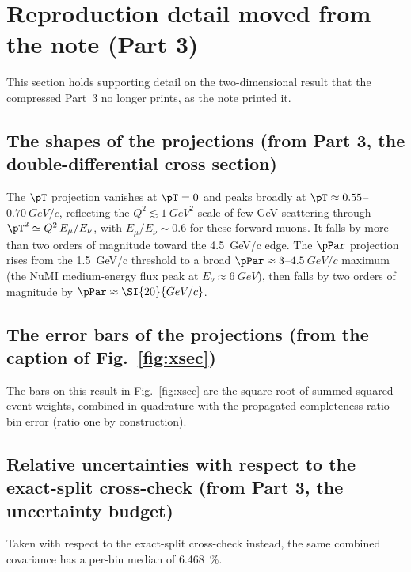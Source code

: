 \section{Reproduction detail moved from the note (Part 3)}
This section holds supporting detail on the two-dimensional result that the compressed Part~3 no longer prints, as the note printed it.

\subsection{The shapes of the projections (from Part 3, the double-differential cross section)}
The $\pT$ projection vanishes at $\pT=0$ and peaks broadly at $\pT\approx0.55$--$\SI{0.70}{GeV/c}$, reflecting the $Q^{2}\lesssim\SI{1}{GeV^2}$ scale of few-GeV scattering through $\pT^{2}\simeq Q^{2}\,E_\mu/E_\nu$, with $E_\mu/E_\nu\sim0.6$ for these forward muons. It falls by more than two orders of magnitude toward the \SI{4.5}{GeV/c} edge. The $\pPar$ projection rises from the \SI{1.5}{GeV/c} threshold to a broad $\pPar\approx3$--$\SI{4.5}{GeV/c}$ maximum (the NuMI medium-energy flux peak at $E_\nu\approx\SI{6}{GeV}$), then falls by two orders of magnitude by $\pPar\approx\SI{20}{GeV/c}$.

\subsection{The error bars of the projections (from the caption of Fig.~\ref{fig:xsec})}
The bars on this result in Fig.~\ref{fig:xsec} are the square root of summed squared event weights, combined in quadrature with the propagated completeness-ratio bin error (ratio one by construction).

\subsection{Relative uncertainties with respect to the exact-split cross-check (from Part 3, the uncertainty budget)}
Taken with respect to the exact-split cross-check instead, the same combined covariance has a per-bin median of \SI{6.468}{\percent}. %

